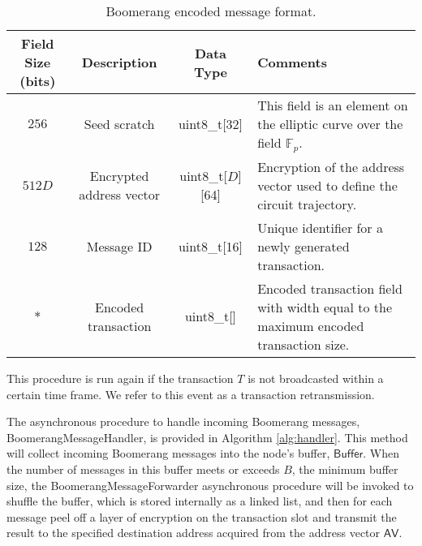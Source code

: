 \begin{table*}
\begin{center}
\caption{Boomerang encoded message format.}
\label{tab:encoded-tx-format}
    \begin{tabular}{|c|c|c|l|} \hline
    \textbf{Field Size (bits)} & {\bf Description} & {\bf Data Type} & {\bf Comments} \\ \hline
    $256$ & Seed scratch & uint8\_t[32] & This field is an element on the elliptic curve over the field $\mathbb{F}_p$. \\
    $512D$ & Encrypted address vector & uint8\_t[$D$][64] & Encryption of the address vector used to define the circuit trajectory. \\
    $128$ & Message ID & uint8\_t[16] & Unique identifier for a newly generated transaction. \\
    $*$ & Encoded transaction & uint8\_t[] & Encoded transaction field with width equal to the maximum encoded transaction size. \\ \hline
    \end{tabular}
\end{center}
\end{table*}

This procedure is run again if the transaction $T$ is not broadcasted within a certain time frame. We refer to this event as a transaction retransmission. 

The asynchronous procedure to handle incoming Boomerang messages, {\sf BoomerangMessageHandler}, is provided in Algorithm \ref{alg:handler}. This method will collect incoming Boomerang messages into the node's buffer, $\mathsf{Buffer}$. When the number of messages in this buffer meets or exceeds $B$, the minimum buffer size, the {\sf BoomerangMessageForwarder} asynchronous procedure will be invoked to shuffle the buffer, which is stored internally as a linked list, and then for each message peel off a layer of encryption on the transaction slot and transmit the result to the specified destination address acquired from the address vector $\mathsf{AV}$.

